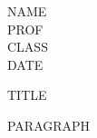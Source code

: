 \documentclass[12pt]{article}
\begin{document}
\begin{flushleft}
NAME\\
PROF\\
CLASS\\
DATE\\
\end{flushleft}

\begin{center}
TITLE
\end{center}

\setlength{\parindent}{0.5in}
PARAGRAPH
\end{document}
